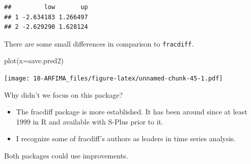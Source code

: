 \documentclass[
]{book}
\newenvironment{Shaded}{\begin{snugshade}}{\end{snugshade}}
\newcommand{\AttributeTok}[1]{\textcolor[rgb]{0.77,0.63,0.00}{#1}}
\newcommand{\DecValTok}[1]{\textcolor[rgb]{0.00,0.00,0.81}{#1}}
\newcommand{\FloatTok}[1]{\textcolor[rgb]{0.00,0.00,0.81}{#1}}
\newcommand{\FunctionTok}[1]{\textcolor[rgb]{0.00,0.00,0.00}{#1}}
\newcommand{\NormalTok}[1]{#1}
\newcommand{\OtherTok}[1]{\textcolor[rgb]{0.56,0.35,0.01}{#1}}
\newcommand{\SpecialCharTok}[1]{\textcolor[rgb]{0.00,0.00,0.00}{#1}}
\providecommand{\tightlist}{%
  \setlength{\itemsep}{0pt}\setlength{\parskip}{0pt}}
\theoremstyle{definition}
\theoremstyle{definition}
\theoremstyle{definition}
\theoremstyle{definition}
\theoremstyle{remark}
\begin{document}
\begin{Shaded}
\end{Shaded}

\begin{verbatim}
##         low       up
## 1 -2.634183 1.266497
## 2 -2.629290 1.628124
\end{verbatim}

There are some small differences in comparison to \texttt{fracdiff}.

\begin{Shaded}
\begin{Highlighting}[]
\FunctionTok{plot}\NormalTok{(}\AttributeTok{x=}\NormalTok{save.pred2)}
\end{Highlighting}
\end{Shaded}

\texttt{[image: 18-ARFIMA\_files/figure-latex/unnamed-chunk-45-1.pdf]}

Why didn't we focus on this package?

\begin{itemize}
\tightlist
\item
  The fracdiff package is more established. It has been around since at least 1999 in R and available with S-Plus prior to it.
\item
  I recognize some of fracdiff's authors as leaders in time series analysis.
\end{itemize}

Both packages could use improvements.
\end{document}

